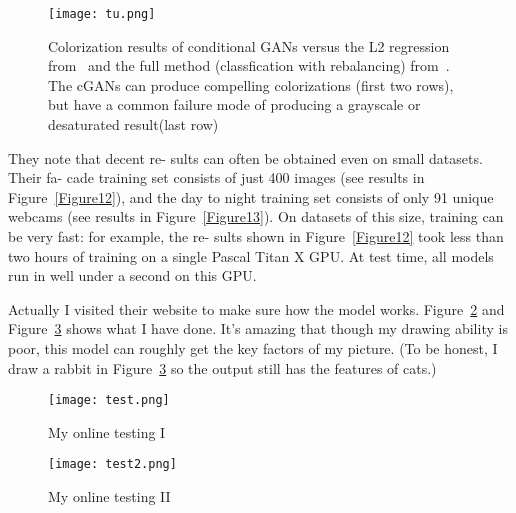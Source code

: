\documentclass[10pt,twocolumn,letterpaper]{article}
\begin{document}
     \begin{figure}[!htb]
 \centering
 \texttt{[image: tu.png]}\\
 \caption{Colorization results of conditional GANs versus the L2 regression from~\cite{name46} and the full method (classfication with rebalancing) from~\cite{name48}. The cGANs can produce compelling colorizations (first two rows), but have a common failure mode of producing a grayscale or desaturated result(last row)}\label{Figure9}
 \end{figure}
 \newpage
 \par They note that decent re-
sults can often be obtained even on small datasets. Their fa-
cade training set consists of just 400 images (see results in
Figure~\ref{Figure12}), and the day to night training set consists of only
91 unique webcams (see results in Figure~\ref{Figure13}). On datasets
of this size, training can be very fast: for example, the re-
sults shown in Figure~\ref{Figure12} took less than two hours of training
on a single Pascal Titan X GPU. At test time, all models run
in well under a second on this GPU.
\par Actually I visited their website to make sure how the model works. Figure~\ref{Figure1} and Figure~\ref{Figure2} shows what I have done. It's amazing that though my drawing ability is poor, this model can roughly get the key factors of my picture. (To be honest, I draw a rabbit in Figure~\ref{Figure2} so the output still has the features of cats.)
     \begin{figure}[!htb]
 \centering
 \texttt{[image: test.png]}\\
 \caption{My online testing I}\label{Figure1}
 \end{figure}
      \begin{figure}[!htb]
 \centering
 \texttt{[image: test2.png]}\\
 \caption{My online testing II}\label{Figure2}
 \end{figure}


\end{document}
